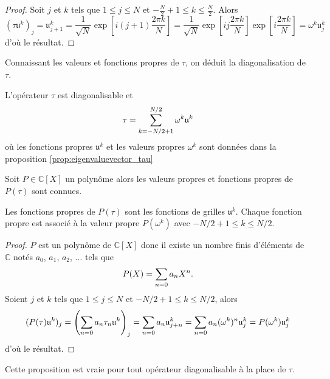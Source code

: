 \begin{proof}
Soit $j$ et $k$ tels que $1 \leq j \leq N$ et $-\frac{N}{2}+1 \leq k \leq \frac{N}{2}$. Alors
\begin{equation}
(\tau \mathfrak{u}^k)_j = \mathfrak{u}^k_{j+1}  = \dfrac{1}{\sqrt{N}}\exp \left[ i (j+1) \dfrac{2 \pi k}{N} \right] = \dfrac{1}{\sqrt{N}} \exp \left[ i j \dfrac{2 \pi k}{N} \right] \exp \left[ i \dfrac{2 \pi k}{N} \right]  = \omega^k \mathfrak{u}_j^k
\end{equation}
d'où le résultat.
\end{proof}
Connaissant les valeurs et fonctions propres de $\tau$, on déduit la diagonalisation de $\tau$.

\begin{corollaire}
L'opérateur $\tau$ est diagonalisable et 
\begin{equation}
\tau = \displaystyle\sum\limits_{k = -N/2+1}^{N/2} \omega^k \mathfrak{u}^k
\end{equation}
où les fonctions propres $\mathfrak{u}^k$ et les valeurs propres $\omega^k$ sont données dans la proposition \ref{prop:eigenvaluevector_tau}
\end{corollaire}
Soit $P \in \mathbb{C}[X]$ un polynôme alors les valeurs propres et fonctions propres de $P(\tau)$ sont connues.

\begin{proposition}
Les fonctions propres de $P(\tau)$ sont les fonctions de grilles $\mathfrak{u}^k$.
Chaque fonction propre est associé à la valeur propre $P(\omega^k)$ avec $-N/2+1 \leq k \leq N/2$.
\label{prop:eigen_Ptau}
\end{proposition}

\begin{proof}
$P$ est un polynôme de $\mathbb{C}[X]$ donc il existe un nombre finis d'éléments de $\mathbb{C}$ notés $a_0$, $a_1$, $a_2$, ... tels que
\begin{equation}
P(X) = \displaystyle\sum\limits_{n=0} a_n X^n.
\end{equation}
Soient $j$ et $k$ tels que $1 \leq j \leq N$ et $-N/2+1 \leq k \leq N/2$, alors 
\begin{equation}
(P(\tau) \mathfrak{u}^k)_j = \left( \displaystyle\sum\limits_{n=0} a_n \tau_n \mathfrak{u}^k \right)_j = \displaystyle\sum\limits_{n=0} a_n \mathfrak{u}^k_{j+n}  = \displaystyle\sum\limits_{n=0} a_n (\omega^k)^n \mathfrak{u}^k_j = P(\omega^k) \mathfrak{u}^k_j
\end{equation}
d'où le résultat.
\end{proof}

Cette proposition est vraie pour tout opérateur diagonalisable à la place de $\tau$.

